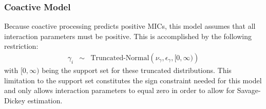 \subsubsection{Coactive Model}
Because coactive processing predicts positive MICs, this model assumes
that all interaction parameters must be positive.  This is
accomplished by the following restriction:
\begin{eqnarray*}
\gamma_i &\sim& \mbox{Truncated-Normal}\left(\nu_\gamma,\epsilon_\gamma,[0,\infty)\right)
\end{eqnarray*}
with $[0,\infty)$ being the support set for these truncated
distributions.  This limitation to the support set constitutes the
sign constraint needed for this model and only allows interaction
parameters to equal zero in order to allow for Savage-Dickey
estimation.


